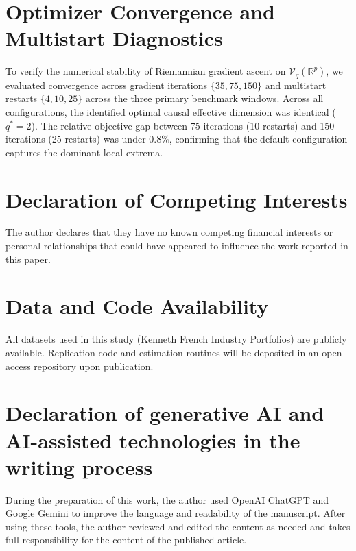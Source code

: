 \documentclass[review,12pt,authoryear]{elsarticle}
\begin{document}
\section{Optimizer Convergence and Multistart Diagnostics}
\label{app:optimizer}
To verify the numerical stability of Riemannian gradient ascent on $\mathcal{V}_q(\mathbb{R}^p)$, we evaluated convergence across gradient iterations $\{35, 75, 150\}$ and multistart restarts $\{4, 10, 25\}$ across the three primary benchmark windows. Across all configurations, the identified optimal causal effective dimension was identical ($q^* = 2$). The relative objective gap between 75 iterations (10 restarts) and 150 iterations (25 restarts) was under 0.8\%, confirming that the default configuration captures the dominant local extrema.

\section*{Declaration of Competing Interests}
The author declares that they have no known competing financial interests or personal relationships that could have appeared to influence the work reported in this paper.

\section*{Data and Code Availability}
All datasets used in this study (Kenneth French Industry Portfolios) are publicly available. Replication code and estimation routines will be deposited in an open-access repository upon publication.

\section*{Declaration of generative AI and AI-assisted technologies in the writing process}
During the preparation of this work, the author used OpenAI ChatGPT and Google Gemini to improve the language and readability of the manuscript. After using these tools, the author reviewed and edited the content as needed and takes full responsibility for the content of the published article.
\end{document}
